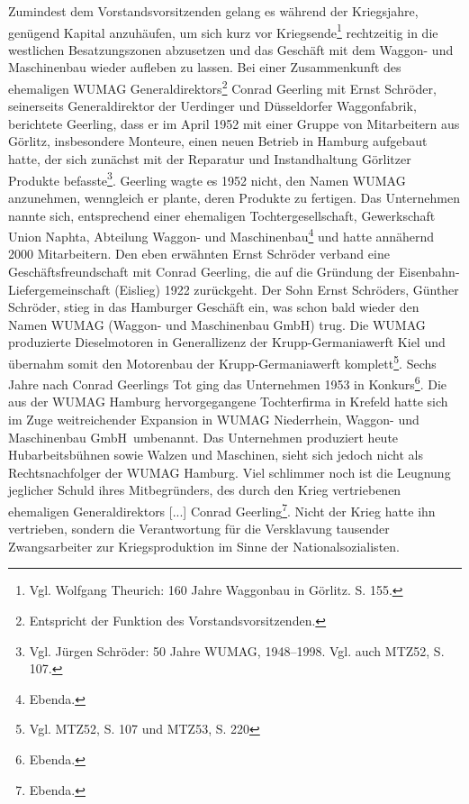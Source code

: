 Zumindest dem Vorstandsvorsitzenden gelang es während der Kriegsjahre, genügend Kapital anzuhäufen, um sich kurz vor Kriegsende\footnote{Vgl. Wolfgang Theurich: 160 Jahre Waggonbau in Görlitz. S. 155.} rechtzeitig in die westlichen Besatzungszonen abzusetzen und das Geschäft mit dem Waggon- und Maschinenbau wieder aufleben zu lassen.
\newline
Bei einer Zusammenkunft des ehemaligen WUMAG Generaldirektors\footnote{Entspricht der Funktion des Vorstandsvorsitzenden.} Conrad Geerling mit Ernst Schröder, seinerseits Generaldirektor der Uerdinger und Düsseldorfer Waggonfabrik, berichtete Geerling, dass er im April 1952 mit einer Gruppe von Mitarbeitern aus Görlitz, insbesondere Monteure, einen neuen Betrieb in Hamburg aufgebaut hatte, der sich zunächst mit der Reparatur und Instandhaltung Görlitzer Produkte befasste\footnote{Vgl. Jürgen Schröder: 50 Jahre WUMAG, 1948--1998. Vgl. auch MTZ52, S. 107.}.
Geerling wagte es 1952 nicht, den Namen WUMAG anzunehmen, wenngleich er plante, deren Produkte zu fertigen. Das Unternehmen nannte sich, entsprechend einer ehemaligen Tochtergesellschaft, \glqq Gewerkschaft Union Naphta, Abteilung Waggon- und Maschinenbau\grqq\footnote{Ebenda.} und hatte annähernd 2000 Mitarbeitern.
\newline
Den eben erwähnten Ernst Schröder verband eine Geschäftsfreundschaft mit Conrad Geerling, die auf die Gründung der Eisenbahn-Liefergemeinschaft (\glqq Eislieg\grqq) 1922 zurückgeht. Der Sohn Ernst Schröders, Günther Schröder, stieg in das Hamburger Geschäft ein, was schon bald wieder den Namen WUMAG (Waggon- und Maschinenbau GmbH) trug. Die WUMAG produzierte Dieselmotoren in Generallizenz der Krupp-Germaniawerft Kiel und übernahm somit den Motorenbau der Krupp-Germaniawerft komplett\footnote{Vgl. MTZ52, S. 107 und MTZ53, S. 220}.
Sechs Jahre nach Conrad Geerlings Tot ging das Unternehmen 1953 in Konkurs\footnote{Ebenda.}. Die aus der WUMAG Hamburg hervorgegangene Tochterfirma in Krefeld hatte sich im Zuge weitreichender Expansion in \glqq WUMAG Niederrhein, Waggon- und Maschinenbau GmbH\grqq~umbenannt. Das Unternehmen produziert heute Hubarbeitsbühnen sowie Walzen und Maschinen, sieht sich jedoch nicht als Rechtsnachfolger der WUMAG Hamburg. Viel schlimmer noch ist die Leugnung jeglicher Schuld ihres Mitbegründers, des \glqq durch den Krieg vertriebenen ehemaligen Generaldirektors [...] Conrad Geerling\grqq\footnote{Ebenda.}. Nicht der Krieg hatte ihn vertrieben, sondern die Verantwortung für die Versklavung tausender Zwangsarbeiter zur Kriegsproduktion im Sinne der Nationalsozialisten.


